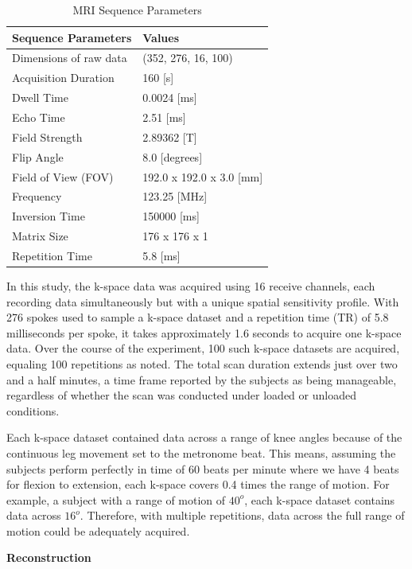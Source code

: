 \documentclass{micro-econ-thesis}
\begin{document}
\begin{table}[H]
	\centering
	\label{tab:mri_seq_params}
	\caption{MRI Sequence Parameters}
	\begin{tabular}{@{}ll@{}}
		\toprule
		Sequence Parameters & Values \\ \midrule
		Dimensions of raw data & (352, 276, 16, 100) \\
		Acquisition Duration & 160 [s] \\
		Dwell Time & 0.0024 [ms] \\
		Echo Time & 2.51 [ms] \\
		Field Strength & 2.89362 [T] \\
		Flip Angle & 8.0 [degrees] \\
		Field of View (FOV) & 192.0 x 192.0 x 3.0 [mm] \\
		Frequency & 123.25 [MHz] \\
		Inversion Time & 150000 [ms] \\
		Matrix Size & 176 x 176 x 1 \\
		Repetition Time & 5.8 [ms] \\
		\bottomrule
	\end{tabular}
\end{table}

In this study, the k-space data was acquired using 16 receive channels, each recording data simultaneously but with a unique spatial sensitivity profile. With 276 spokes used to sample a k-space dataset and a repetition time (TR) of 5.8 milliseconds per spoke, it takes approximately 1.6 seconds to acquire one k-space data. Over the course of the experiment, 100 such k-space datasets are acquired, equaling 100 repetitions as noted. The total scan duration extends just over two and a half minutes, a time frame reported by the subjects as being manageable, regardless of whether the scan was conducted under loaded or unloaded conditions.

Each k-space dataset contained data across a range of knee angles because of the continuous leg movement set to the metronome beat. This means, assuming the subjects perform perfectly in time of 60 beats per minute where we have 4 beats for flexion to extension, each k-space covers 0.4 times the range of motion. For example, a subject with a range of motion of $40^o$, each k-space dataset contains data across $16^o$. Therefore, with multiple repetitions, data across the full range of motion could be adequately acquired.      

\textbf{Reconstruction}
\end{document}
